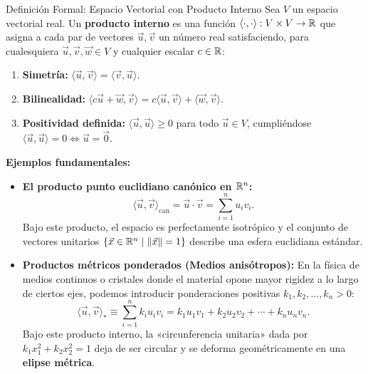 \documentclass[11pt,letterpaper]{article}
\begin{document}
\begin{theorembox}{Definición Formal: Espacio Vectorial con Producto Interno}
Sea $V$ un espacio vectorial real. Un \textbf{producto interno} es una función $\langle \cdot, \cdot \rangle: V \times V \to \mathbb{R}$ que asigna a cada par de vectores $\vec{u}, \vec{v}$ un número real satisfaciendo, para cualesquiera $\vec{u}, \vec{v}, \vec{w} \in V$ y cualquier escalar $c \in \mathbb{R}$:
\begin{enumerate}
    \item \textbf{Simetría:} $\langle \vec{u}, \vec{v} \rangle = \langle \vec{v}, \vec{u} \rangle$.
    \item \textbf{Bilinealidad:} $\langle c\vec{u} + \vec{w}, \vec{v} \rangle = c\langle \vec{u}, \vec{v} \rangle + \langle \vec{w}, \vec{v} \rangle$.
    \item \textbf{Positividad definida:} $\langle \vec{u}, \vec{u} \rangle \ge 0$ para todo $\vec{u} \in V$, cumpliéndose $\langle \vec{u}, \vec{u} \rangle = 0 \iff \vec{u} = \vec{0}$.
\end{enumerate}
\textbf{Ejemplos fundamentales:}
\begin{itemize}
    \item \textbf{El producto punto euclidiano canónico en $\mathbb{R}^n$:}
    \[
    \langle \vec{u}, \vec{v} \rangle_{\text{can}} = \vec{u}\cdot\vec{v} = \sum_{i=1}^n u_i v_i.
    \]
    Bajo este producto, el espacio es perfectamente isotrópico y el conjunto de vectores unitarios $\{\vec{x} \in \mathbb{R}^n \mid \|\vec{x}\| = 1\}$ describe una esfera euclidiana estándar.
    \item \textbf{Productos métricos ponderados (Medios anisótropos):} En la física de medios continuos o cristales donde el material opone mayor rigidez a lo largo de ciertos ejes, podemos introducir ponderaciones positivas $k_1, k_2, \dots, k_n > 0$:
    \[
    \langle \vec{u}, \vec{v} \rangle_* \equiv \sum_{i=1}^n k_i u_i v_i = k_1 u_1 v_1 + k_2 u_2 v_2 + \cdots + k_n u_n v_n.
    \]
    Bajo este producto interno, la «circunferencia unitaria» dada por $k_1 x_1^2 + k_2 x_2^2 = 1$ deja de ser circular y se deforma geométricamente en una \textbf{elipse métrica}.
\end{itemize}
\end{theorembox}
\end{document}
